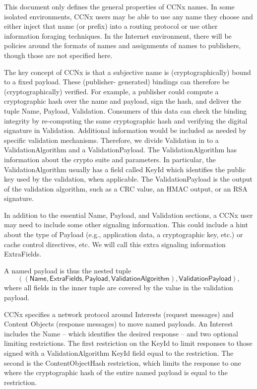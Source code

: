 \documentclass[12pt]{article}
\begin{document}
This document only defines the general properties of CCNx names.  In
some isolated environments, CCNx users may be able to use any name
they choose and either inject that name (or prefix) into a routing
protocol or use other information foraging techniques. In the
Internet environment, there will be policies around the formats of
names and assignments of names to publishers, though those are not
specified here.

The key concept of CCNx is that a subjective name is
(cryptographically) bound to a fixed payload. These (publisher-
generated) bindings can therefore be (cryptographically) verified.
For example, a publisher could compute a cryptographic hash over the
name and payload, sign the hash, and deliver the tuple {Name,
Payload, Validation}.  Consumers of this data can check the binding
integrity by re-computing the same cryptographic hash and verifying
the digital signature in Validation.  Additional information would be
included as needed by specific validation mechanisms.  Therefore, we
divide Validation in to a ValidationAlgorithm and a
ValidationPayload.  The ValidationAlgorithm has information about the
crypto suite and parameters.  In particular, the ValidationAlgorithm
usually has a field called KeyId which identifies the public key used
by the validation, when applicable.  The ValidationPayload is the
output of the validation algorithm, such as a CRC value, an HMAC
output, or an RSA signature.

In addition to the essential Name, Payload, and Validation sections,
a CCNx user may need to include some other signaling information.
This could include a hint about the type of Payload (e.g.,
application data, a cryptographic key, etc.) or cache control
directives, etc.  We will call this extra signaling information
ExtraFields.

A named payload is thus the nested tuple
$$
((\mathsf{Name}, \mathsf{ExtraFields}, \mathsf{Payload}, \mathsf{ValidationAlgorithm}), \mathsf{ValidationPayload}),
$$
where all fields in the inner tuple are covered by the value in the validation payload.

CCNx specifies a network protocol around Interests (request messages)
and Content Objects (response messages) to move named payloads. An
Interest includes the Name -- which identifies the desired response
-- and two optional limiting restrictions.  The first restriction on
the KeyId to limit responses to those signed with a
ValidationAlgorithm KeyId field equal to the restriction. The second
is the ContentObjectHash restriction, which limits the response to
one where the cryptographic hash of the entire named payload is equal
to the restriction.
\end{document}
